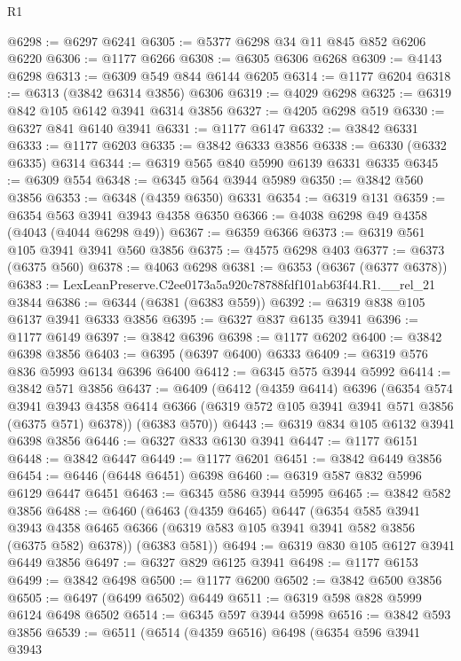 \begin{lexlean}{R1}
\begin{coremodule}
@6298 := @6297 @6241
@6305 := @5377 @6298 @34 @11 @845 @852 @6206 @6220
@6306 := @1177 @6266
@6308 := @6305 @6306 @6268
@6309 := @4143 @6298
@6313 := @6309 @549 @844 @6144 @6205
@6314 := @1177 @6204
@6318 := @6313 (@3842 @6314 @3856) @6306
@6319 := @4029 @6298
@6325 := @6319 @842 @105 @6142 @3941 @6314 @3856
@6327 := @4205 @6298 @519
@6330 := @6327 @841 @6140 @3941
@6331 := @1177 @6147
@6332 := @3842 @6331
@6333 := @1177 @6203
@6335 := @3842 @6333 @3856
@6338 := @6330 (@6332 @6335) @6314
@6344 := @6319 @565 @840 @5990 @6139 @6331 @6335
@6345 := @6309 @554
@6348 := @6345 @564 @3944 @5989
@6350 := @3842 @560 @3856
@6353 := @6348 (@4359 @6350) @6331
@6354 := @6319 @131
@6359 := @6354 @563 @3941 @3943 @4358 @6350
@6366 := @4038 @6298 @49 @4358 (@4043 (@4044 @6298 @49))
@6367 := @6359 @6366
@6373 := @6319 @561 @105 @3941 @3941 @560 @3856
@6375 := @4575 @6298 @403
@6377 := @6373 (@6375 @560)
@6378 := @4063 @6298
@6381 := @6353 (@6367 (@6377 @6378))
@6383 := LexLeanPreserve.C2ee0173a5a920c78788fdf101ab63f44.R1.__rel_21 @3844
@6386 := @6344 (@6381 (@6383 @559))
@6392 := @6319 @838 @105 @6137 @3941 @6333 @3856
@6395 := @6327 @837 @6135 @3941
@6396 := @1177 @6149
@6397 := @3842 @6396
@6398 := @1177 @6202
@6400 := @3842 @6398 @3856
@6403 := @6395 (@6397 @6400) @6333
@6409 := @6319 @576 @836 @5993 @6134 @6396 @6400
@6412 := @6345 @575 @3944 @5992
@6414 := @3842 @571 @3856
@6437 := @6409
    (@6412
      (@4359 @6414)
      @6396
      (@6354
        @574
        @3941
        @3943
        @4358
        @6414
        @6366
        (@6319 @572 @105 @3941 @3941 @571 @3856 (@6375 @571) @6378))
      (@6383 @570))
@6443 := @6319 @834 @105 @6132 @3941 @6398 @3856
@6446 := @6327 @833 @6130 @3941
@6447 := @1177 @6151
@6448 := @3842 @6447
@6449 := @1177 @6201
@6451 := @3842 @6449 @3856
@6454 := @6446 (@6448 @6451) @6398
@6460 := @6319 @587 @832 @5996 @6129 @6447 @6451
@6463 := @6345 @586 @3944 @5995
@6465 := @3842 @582 @3856
@6488 := @6460
    (@6463
      (@4359 @6465)
      @6447
      (@6354
        @585
        @3941
        @3943
        @4358
        @6465
        @6366
        (@6319 @583 @105 @3941 @3941 @582 @3856 (@6375 @582) @6378))
      (@6383 @581))
@6494 := @6319 @830 @105 @6127 @3941 @6449 @3856
@6497 := @6327 @829 @6125 @3941
@6498 := @1177 @6153
@6499 := @3842 @6498
@6500 := @1177 @6200
@6502 := @3842 @6500 @3856
@6505 := @6497 (@6499 @6502) @6449
@6511 := @6319 @598 @828 @5999 @6124 @6498 @6502
@6514 := @6345 @597 @3944 @5998
@6516 := @3842 @593 @3856
@6539 := @6511
    (@6514
      (@4359 @6516)
      @6498
      (@6354
        @596
        @3941
        @3943

\end{coremodule}
\end{lexlean}
